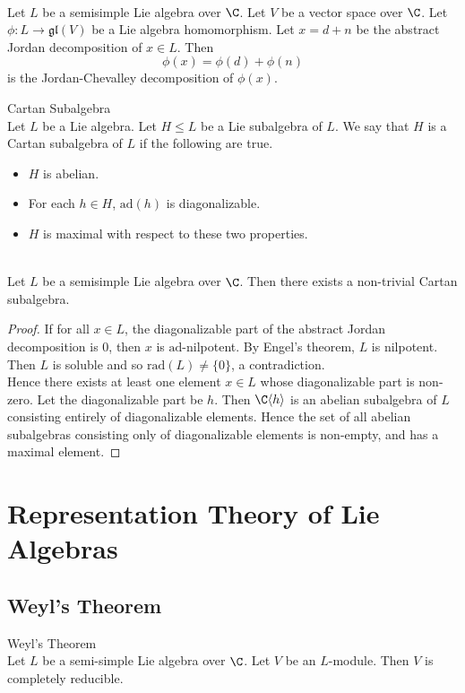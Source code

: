\documentclass[a4paper]{article}
\begin{document}
\begin{prp}{}{} \\Let $L$ be a semisimple Lie algebra over $\C$. Let $V$ be a vector space over $\C$. Let $\phi:L\to\mathfrak{gl}(V)$ be a Lie algebra homomorphism. Let $x=d+n$ be the abstract Jordan decomposition of $x\in L$. Then $$\phi(x)=\phi(d)+\phi(n)$$ is the Jordan-Chevalley decomposition of $\phi(x)$. 
\end{prp}

\begin{defn}{Cartan Subalgebra}{} \\Let $L$ be a Lie algebra. Let $H\leq L$ be a Lie subalgebra of $L$. We say that $H$ is a Cartan subalgebra of $L$ if the following are true. 
\begin{itemize}
\item $H$ is abelian. 
\item For each $h\in H$, $\text{ad}(h)$ is diagonalizable. 
\item $H$ is maximal with respect to these two properties. 
\end{itemize}
\end{defn}

\begin{lmm}{}{} \\Let $L$ be a semisimple Lie algebra over $\C$. Then there exists a non-trivial Cartan subalgebra. 
\begin{proof}
If for all $x\in L$, the diagonalizable part of the abstract Jordan decomposition is $0$, then $x$ is $\text{ad}$-nilpotent. By Engel's theorem, $L$ is nilpotent. Then $L$ is soluble and so $\text{rad}(L)\neq\{0\}$, a contradiction. \\

Hence there exists at least one element $x\in L$ whose diagonalizable part is non-zero. Let the diagonalizable part be $h$. Then $\C\langle h\rangle$ is an abelian subalgebra of $L$ consisting entirely of diagonalizable elements. Hence the set of all abelian subalgebras consisting only of diagonalizable elements is non-empty, and has a maximal element. 
\end{proof}
\end{lmm}

\pagebreak
\section{Representation Theory of Lie Algebras}
\subsection{Weyl's Theorem}
\begin{thm}{Weyl's Theorem}{} \\Let $L$ be a semi-simple Lie algebra over $\C$. Let $V$ be an $L$-module. Then $V$ is completely reducible. 
\end{thm}
\end{document}
